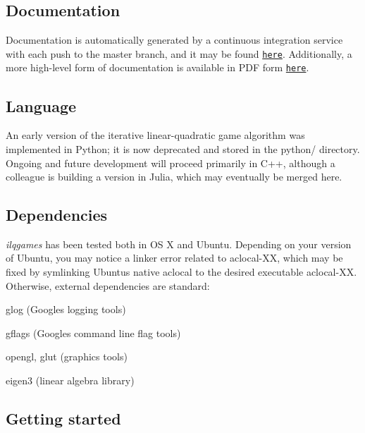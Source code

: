\subsection*{Documentation}

Documentation is automatically generated by a continuous integration service with each push to the {\ttfamily master} branch, and it may be found \href{https://HJReachability.github.io/ilqgames/documentation/html/}{\tt here}. Additionally, a more high-\/level form of documentation is available in P\+DF form \href{https://github.com/HJReachability/ilqgames/blob/master/ILQGames_Documentation.pdf}{\tt here}.

\subsection*{Language}

An early version of the iterative linear-\/quadratic game algorithm was implemented in Python; it is now deprecated and stored in the {\ttfamily python/} directory. Ongoing and future development will proceed primarily in C++, although a colleague is building a version in Julia, which may eventually be merged here.

\subsection*{Dependencies}

{\itshape ilqgames} has been tested both in OS X and Ubuntu. Depending on your version of Ubuntu, you may notice a linker error related to {\ttfamily aclocal-\/\+XX}, which may be fixed by symlinking Ubuntu\textquotesingle{}s native {\ttfamily aclocal} to the desired executable {\ttfamily aclocal-\/\+XX}. Otherwise, external dependencies are standard\+:


\begin{DoxyItemize}
\item {\ttfamily glog} (Google\textquotesingle{}s logging tools)
\item {\ttfamily gflags} (Google\textquotesingle{}s command line flag tools)
\item {\ttfamily opengl}, {\ttfamily glut} (graphics tools)
\item {\ttfamily eigen3} (linear algebra library)
\end{DoxyItemize}

\subsection*{Getting started}

